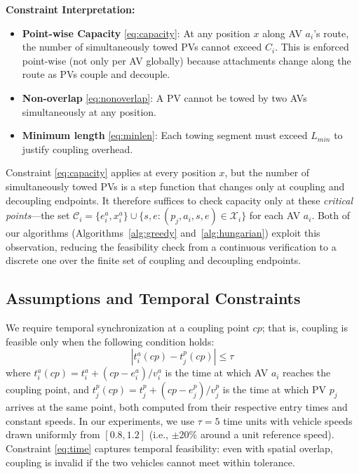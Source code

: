 \documentclass[conference]{IEEEtran}
\begin{document}
\textbf{Constraint Interpretation:}
\begin{itemize}
    \item \textbf{Point-wise Capacity} \eqref{eq:capacity}: At any position $x$ along AV $a_i$'s route, the number of simultaneously towed PVs cannot exceed $C_i$. This is enforced point-wise (not only per AV globally) because attachments change along the route as PVs couple and decouple.
    \item \textbf{Non-overlap} \eqref{eq:nonoverlap}: A PV cannot be towed by two AVs simultaneously at any position.
    \item \textbf{Minimum length} \eqref{eq:minlen}: Each towing segment must exceed $L_{min}$ to justify coupling overhead.
\end{itemize}

Constraint \eqref{eq:capacity} applies at every position $x$, but the number of simultaneously towed PVs is a step function that changes only at coupling and decoupling endpoints. It therefore suffices to check capacity only at these \textit{critical points}---the set $\mathcal{C}_i = \{e_i^a, x_i^a\} \cup \{s, e : (p_j, a_i, s, e) \in \mathcal{X}_i\}$ for each AV $a_i$. Both of our algorithms (Algorithms~\ref{alg:greedy} and~\ref{alg:hungarian}) exploit this observation, reducing the feasibility check from a continuous verification to a discrete one over the finite set of coupling and decoupling endpoints.

\subsection{Assumptions and Temporal Constraints}
We require temporal synchronization at a coupling point $cp$; that is, coupling is feasible only when the following condition holds:
\begin{equation}
    |t_i^a(cp) - t_j^p(cp)| \leq \tau
    \label{eq:time}
\end{equation}
where $t_i^a(cp) = t_i^a + (cp - e_i^a)/v_i^a$ is the time at which AV $a_i$ reaches the coupling point, and $t_j^p(cp) = t_j^p + (cp - e_j^p)/v_j^p$ is the time at which PV $p_j$ arrives at the same point, both computed from their respective entry times and constant speeds. In our experiments, we use $\tau = 5$ time units with vehicle speeds drawn uniformly from $[0.8, 1.2]$ (i.e., $\pm 20\%$ around a unit reference speed).
Constraint \eqref{eq:time} captures temporal feasibility: even with spatial overlap, coupling is invalid if the two vehicles cannot meet within tolerance.
\end{document}
